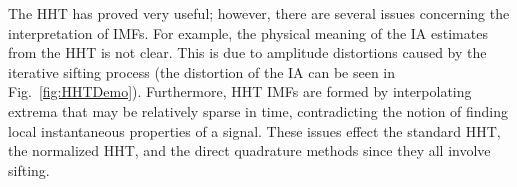 \documentclass[journal,11pt,a4paper,onecolumn,draftcls]{IEEEtran}
\begin{document}
The HHT has proved very useful; however, there are several issues concerning the interpretation of IMFs. For example, the physical meaning of the IA estimates from the HHT is not clear. This is due to amplitude distortions caused by the iterative sifting process (the distortion of the IA can be seen in Fig.~\ref{fig:HHTDemo}). Furthermore, HHT IMFs are formed by interpolating extrema that may be relatively sparse in time, contradicting the notion of finding local instantaneous properties of a signal. These issues effect the standard HHT, the normalized HHT, and the direct quadrature methods since they all involve sifting. 
% 
\end{document}
